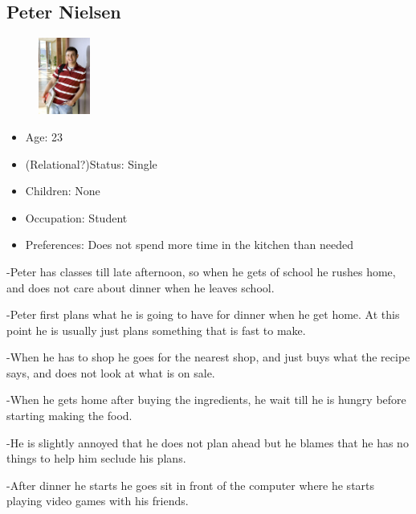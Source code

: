 \subsection{Peter Nielsen}
\begin{figure}[H]
	\includegraphics[width=0.15\textwidth]{Grafik/FoodPlanner/PersonaPeterNielsen}
	\label{PersonaHenrikJensen}
\end{figure}
\begin{itemize}
	\item Age: 23
	\item (Relational?)Status: Single
	\item Children: None
	\item Occupation: Student
	\item Preferences: Does not spend more time in the kitchen than needed
\end{itemize}
-Peter has classes till late afternoon, so when he gets of school he rushes home, and does not care about dinner when he leaves school.

-Peter first plans what he is going to have for dinner when he get home. At this point he is usually just plans something that is fast to make.

-When he has to shop he goes for the nearest shop, and just buys what the recipe says, and does not look at what is on sale.

-When he gets home after buying the ingredients, he wait till he is hungry before starting making the food.

-He is slightly annoyed that he does not plan ahead but he blames that he has no things to help him seclude his plans.

-After dinner he starts he goes sit in front of the computer where he starts playing video games with his friends.

